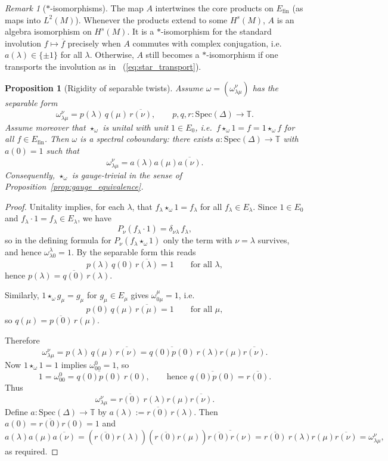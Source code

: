 \documentclass[11pt]{amsart}
\theoremstyle{plain}
\newtheorem{proposition}[theorem]{Proposition}
\theoremstyle{definition}
\theoremstyle{remark}
\newtheorem{remark}[theorem]{Remark}
\newcommand{\Spec}{\mathrm{Spec}}
\newcommand{\bbT}{\mathbb{T}}
\begin{document}
\begin{remark}[$*$-isomorphisms]\label{rem:gauge_star_iso}
The map $A$ intertwines the core products on $E_{\mathrm{fin}}$ (as maps into $L^2(M)$).
Whenever the products extend to some $H^s(M)$, $A$ is an algebra isomorphism on $H^s(M)$.
It is a $*$-isomorphism for the standard involution $f\mapsto\overline f$ precisely when $A$ commutes with complex conjugation,
i.e.\ $a(\lambda)\in\{\pm1\}$ for all $\lambda$.
Otherwise, $A$ still becomes a $*$-isomorphism if one transports the involution as in ~(\ref{eq:star_transport}).
\end{remark}

\begin{proposition}[Rigidity of separable twists]\label{prop:separable_twists_are_coboundaries}
Assume $\omega=(\omega^\nu_{\lambda\mu})$ has the separable form
\[
\omega^\nu_{\lambda\mu}=p(\lambda)\,q(\mu)\,\overline{r(\nu)},
\qquad p,q,r:\Spec(\Delta)\to\bbT.
\]
Assume moreover that $\star_\omega$ is unital with unit $1\in E_0$, i.e.\ $f\star_\omega 1=f=1\star_\omega f$ for all $f\in E_{\mathrm{fin}}$.
Then $\omega$ is a spectral coboundary: there exists $a:\Spec(\Delta)\to\bbT$ with $a(0)=1$ such that
\[
\omega^\nu_{\lambda\mu}=a(\lambda)a(\mu)\overline{a(\nu)}.
\]
Consequently, $\star_\omega$ is gauge-trivial in the sense of Proposition~\ref{prop:gauge_equivalence}.
\end{proposition}

\begin{proof}
Unitality implies, for each $\lambda$, that $f_\lambda\star_\omega 1=f_\lambda$ for all $f_\lambda\in E_\lambda$.
Since $1\in E_0$ and $f_\lambda\cdot 1=f_\lambda\in E_\lambda$, we have
\[
P_\nu(f_\lambda\cdot 1)=\delta_{\nu\lambda}\,f_\lambda,
\]
so in the defining formula for $P_\nu(f_\lambda\star_\omega 1)$ only the term with $\nu=\lambda$ survives, and hence $\omega^\lambda_{\lambda 0}=1$.
By the separable form this reads
\[
p(\lambda)\,q(0)\,\overline{r(\lambda)}=1\qquad\text{for all }\lambda,
\]
hence $p(\lambda)=\overline{q(0)}\,r(\lambda)$.

Similarly, $1\star_\omega g_\mu=g_\mu$ for $g_\mu\in E_\mu$ gives $\omega^\mu_{0\mu}=1$, i.e.
\[
p(0)\,q(\mu)\,\overline{r(\mu)}=1\qquad\text{for all }\mu,
\]
so $q(\mu)=\overline{p(0)}\,r(\mu)$.

Therefore
\[
\omega^\nu_{\lambda\mu}
=
p(\lambda)\,q(\mu)\,\overline{r(\nu)}
=
\overline{q(0)p(0)}\ r(\lambda)r(\mu)\overline{r(\nu)}.
\]
Now $1\star_\omega 1=1$ implies $\omega^0_{00}=1$, so
\[
1=\omega^0_{00}=\overline{q(0)p(0)}\ r(0),
\qquad\text{hence }\overline{q(0)p(0)}=\overline{r(0)}.
\]
Thus
\[
\omega^\nu_{\lambda\mu}=\overline{r(0)}\ r(\lambda)r(\mu)\overline{r(\nu)}.
\]
Define $a:\Spec(\Delta)\to\bbT$ by $a(\lambda):=\overline{r(0)}\,r(\lambda)$.
Then $a(0)=\overline{r(0)}r(0)=1$ and
\[
a(\lambda)a(\mu)\overline{a(\nu)}
=
(\overline{r(0)}r(\lambda))(\overline{r(0)}r(\mu))\overline{\overline{r(0)}r(\nu)}
=
\overline{r(0)}\ r(\lambda)r(\mu)\overline{r(\nu)}
=
\omega^\nu_{\lambda\mu},
\]
as required.
\end{proof}
\end{document}
